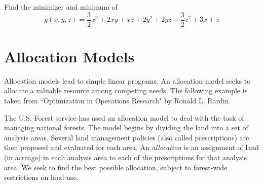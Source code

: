 \begin{problem}
Find the minimizer and minimum of
\begin{equation*}
g(x,y,z) = \frac{3}{2}x^2 +2xy + xz+ 2y^2 +2yz+\frac{3}{2}z^2+3x + z
\end{equation*}
\begin{comment}
\begin{equation}
f(x) = \frac{1}{2}x^TQx - x^Tp
\end{equation}
where

\begin{center}
$Q =
\begin{bmatrix}
3 & 2 & 1\\
2 & 4 & 2\\
1 & 2 & 3\\
\end{bmatrix}
$
and $p =
\begin{bmatrix}
3\\
0\\
1\\
\end{bmatrix}
$
\end{center}
\end{comment}

\end{problem}

\section*{Allocation Models}
Allocation models lead to simple linear programs. An allocation model seeks to allocate a valuable resource among competing needs. The following example is taken from ``Optimization in Operations Research" by Ronald L. Rardin. %

The U.S. Forest service has used an allocation model to deal with the task of managing national forests. 
The model begins by dividing the land into a set of analysis areas. Several land management policies (also 
called prescriptions) are then proposed and evaluated for each area. 
An \emph{allocation} is an assignment of land (in acreage) in each analysis area to each of the 
prescriptions for that analysis area.
We seek to find the best possible allocation, subject to forest-wide restrictions on land use.

